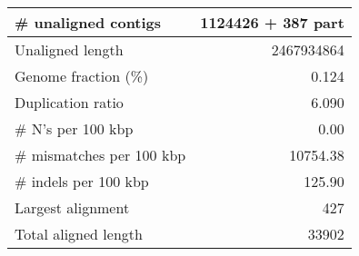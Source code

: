 \documentclass[12pt,a4paper]{article}
\begin{document}
\begin{table}[ht]
\begin{center}
\begin{tabular}{|l*{1}{|r}|}
\# unaligned contigs & 1124426 + 387 part \\ \hline
Unaligned length & 2467934864 \\ \hline
Genome fraction (\%) & 0.124 \\ \hline
Duplication ratio & 6.090 \\ \hline
\# N's per 100 kbp & 0.00 \\ \hline
\# mismatches per 100 kbp & 10754.38 \\ \hline
\# indels per 100 kbp & 125.90 \\ \hline
Largest alignment & 427 \\ \hline
Total aligned length & 33902 \\ \hline
\end{tabular}
\end{center}
\end{table}
\end{document}
